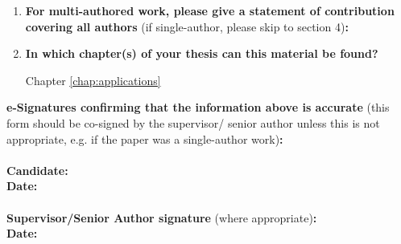 {\begin{enumerate}[leftmargin=*,label={\bfseries\arabic*.}]
\begin{enumerate}[label={\alph*)}]
	\item \textbf{Has the manuscript been uploaded to a preprint server `e.g. medRxiv'?
	\\
	If `Yes', please please give a link or doi:}

	Yes, \url{https://www.researchgate.net/publication/367116849_Stability_of_white_matter_tract_segmentation_methods_with_decreasing_data_quality}
	\item \textbf{Where is the work intended to be published?}

	N/A
	\item \textbf{List the manuscript's authors in the intended authorship order:}

	\citeauthor*{Young2022a}
	\item \textbf{Stage of publication:}

	Work presented at conference, no proceedings published.
\end{enumerate}

\item \textbf{For multi-authored work, please give a statement of contribution covering all authors} (if single-author, please skip to section 4)\textbf{:}
\item \textbf{In which chapter(s) of your thesis can this material be found?}

Chapter \ref{chap:applications}
\end{enumerate}

\textbf{e-Signatures confirming that the information above is accurate}
(this form should be co-signed by the supervisor/ senior author unless this is not appropriate, e.g. if the paper was a single-author work)\textbf{:}\\
\textbf{}\\
\textbf{Candidate:}\\
\textbf{Date:}\\
\textbf{}\\
\textbf{Supervisor/Senior Author signature} (where appropriate)\textbf{:}\\
\textbf{Date:}
%
}%
